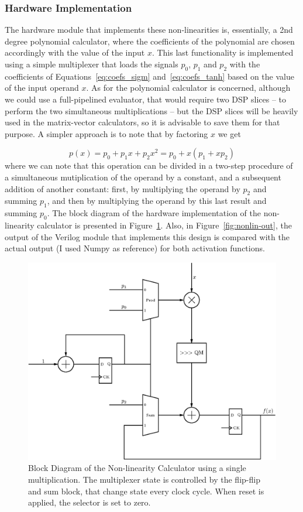\subsubsection{Hardware Implementation}
The hardware module that implements these non-linearities is, essentially, a 2nd degree polynomial calculator, where the coefficients of the polynomial are chosen accordingly with the value of the input $x$. This last functionality
is implemented using a simple multiplexer that loads the signals $p_0$, $p_1$ and $p_2$ with the coefficients of Equations~\ref{eq:coefs_sigm} and~\ref{eq:coefs_tanh} based on the value of the input operand $x$. As for the polynomial calculator is concerned, although we could use a full-pipelined evaluator, that would require two DSP slices -- to perform the two simultaneous multiplications -- but the DSP slices will be heavily used in the matrix-vector calculators, so it is advisable to save them for that purpose. A simpler approach is to note that by factoring $x$ we get

\begin{equation}\label{eq:factorPol}
p(x) = p_0 + p_1x + p_2x^2 = p_0 + x(p_1 + xp_2)
\end{equation}
where we can note that this operation can be divided in a two-step procedure of a simultaneous mutiplication of the operand by a constant, and a subsequent addition of another constant: first, by multiplying the operand by $p_2$ and summing $p_1$, and then by multiplying the operand by this last result and summing $p_0$. The block diagram of the hardware implementation of the non-linearity calculator is presented in Figure~\ref{fig:nonlin}. Also, in Figure~\ref{fig:nonlin-out}, the output of the Verilog module that implements this design is compared with the actual output (I used Numpy as reference) for both activation functions.

\begin{figure}[H]
    \centering
    \includegraphics[width=0.9\linewidth]{figures/non-lin.eps}
    \caption[Block Diagram of the Non-linearity Calculator]{Block Diagram of the Non-linearity Calculator using a single multiplication. The multiplexer state is controlled by the flip-flip and sum block, that change state every clock cycle. When reset is applied, the selector is set to zero.}
    \label{fig:nonlin}
\end{figure}

